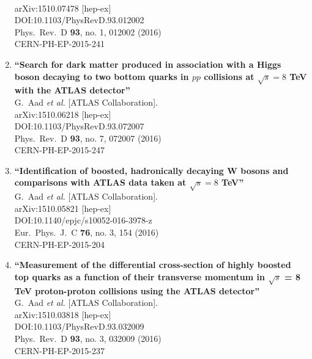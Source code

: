 \documentclass{article}
\begin{document}
\begin{enumerate}
  \\{}arXiv:1510.07478 [hep-ex]
  \\{}DOI:10.1103/PhysRevD.93.012002
  \\{}Phys.\ Rev.\ D {\bf 93}, no. 1, 012002 (2016)
  \\{}CERN-PH-EP-2015-241
\item%
{\bf ``Search for dark matter produced in association with a Higgs boson decaying to two bottom quarks in $pp$ collisions at $\sqrt{s} = 8$ TeV with the ATLAS detector''}
  \\{}G.~Aad {\it et al.} [ATLAS Collaboration].
  \\{}arXiv:1510.06218 [hep-ex]
  \\{}DOI:10.1103/PhysRevD.93.072007
  \\{}Phys.\ Rev.\ D {\bf 93}, no. 7, 072007 (2016)
  \\{}CERN-PH-EP-2015-247
\item%
{\bf ``Identification of boosted, hadronically decaying W bosons and comparisons with ATLAS data taken at $\sqrt{s} = 8$ TeV''}
  \\{}G.~Aad {\it et al.} [ATLAS Collaboration].
  \\{}arXiv:1510.05821 [hep-ex]
  \\{}DOI:10.1140/epjc/s10052-016-3978-z
  \\{}Eur.\ Phys.\ J.\ C {\bf 76}, no. 3, 154 (2016)
  \\{}CERN-PH-EP-2015-204
\item%
{\bf ``Measurement of the differential cross-section of highly boosted top quarks as a function of their transverse momentum in $\sqrt{s}$ = 8 TeV proton-proton collisions using the ATLAS detector''}
  \\{}G.~Aad {\it et al.} [ATLAS Collaboration].
  \\{}arXiv:1510.03818 [hep-ex]
  \\{}DOI:10.1103/PhysRevD.93.032009
  \\{}Phys.\ Rev.\ D {\bf 93}, no. 3, 032009 (2016)
  \\{}CERN-PH-EP-2015-237

\end{enumerate}
\end{document}
